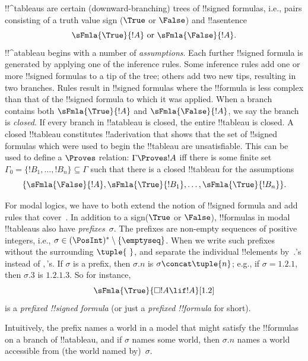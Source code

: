 \documentclass[../../../include/open-logic-section]{subfiles}
\begin{document}


!!^{tableau}s are certain (downward-branching) trees of !!{signed
  formula}s, i.e., pairs consisting of a truth value sign ($\True$ or
$\False$) and !!a{sentence}
\[
\sFmla{\True}{!A} \text{ or } \sFmla{\False}{!A}.
\]
!!^a{tableau} begins with a number of \emph{assumptions}. Each further
!!{signed formula} is generated by applying one of the inference
rules. Some inference rules add one or more !!{signed formula}s to a
tip of the tree; others add two new tips, resulting in two branches.
Rules result in !!{signed formula}s where the !!{formula} is
less complex than that of the !!{signed formula} to which it was
applied. When a branch contains both $\sFmla{\True}{!A}$ and
$\sFmla{\False}{!A}$, we say the branch is \emph{closed}. If every
branch in !!a{tableau} is closed, the entire !!{tableau} is closed. A
closed !!{tableau} constitutes !!a{derivation} that shows that the set
of !!{signed formula}s which were used to begin the !!{tableau} are
unsatisfiable.  This can be used to define a $\Proves$ relation:
$\Gamma \Proves !A$ iff there is some finite set~$\Gamma_0 = \{!B_1,
\dots, !B_n\} \subseteq \Gamma$ such that there is a closed
!!{tableau} for the assumptions
\[
\{\sFmla{\False}{!A}, \sFmla{\True}{!B_1}, \dots, \sFmla{\True}{!B_n}\}.
\]

For modal logics, we have to both extend the notion of !!{signed
formula} and add rules that
cover~. In addition to a sign($\True$ or
$\False$), !!{formula}s in modal !!{tableau}s also have
\emph{prefixes}~$\sigma$. The prefixes are non-empty sequences of
positive integers, i.e., $\sigma \in (\PosInt)^* \setminus
\{\emptyseq\}$. When we write such prefixes without the surrounding
$\tuple{\ }$, and separate the individual !!{element}s by~$.$'s
instead of $,$'s. If $\sigma$ is a prefix, then $\sigma.n$ is $\sigma
\concat \tuple{n}$; e.g., if $\sigma = 1.2.1$, then $\sigma.3$ is
$1.2.1.3$. So for instance,
\[
\sFmla{\True}{\Box !A \lif !A}[1.2]
\]
is a \emph{prefixed !!{signed formula}} (or just a \emph{prefixed
  !!{formula}} for short).

Intuitively, the prefix names a world in a model that might satisfy
the !!{formula}s on a branch of !!a{tableau}, and if $\sigma$ names
some world, then $\sigma.n$ names a world accessible from (the world
named by)~$\sigma$.
\end{document}
